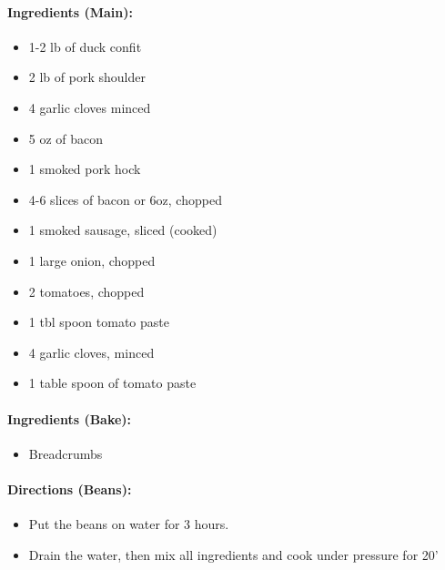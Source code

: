 \documentclass{article}
\begin{document}
\paragraph{Ingredients (Main):}
\begin{itemize}
    \item 1-2 lb of duck confit
    \item 2 lb of pork shoulder
    \item 4 garlic cloves minced
    \item 5 oz of bacon
    \item 1 smoked pork hock
    \item 4-6 slices of bacon or 6oz, chopped
    \item 1 smoked sausage, sliced (cooked)
    \item 1 large onion, chopped
    \item 2 tomatoes, chopped
    \item 1 tbl spoon tomato paste
    \item 4 garlic cloves, minced
    \item 1 table spoon of tomato paste
\end{itemize}  

\paragraph{Ingredients (Bake):}
\begin{itemize}
    \item Breadcrumbs
\end{itemize}  

\paragraph{Directions (Beans):}
\begin{itemize}
    \item Put the beans on water for 3 hours.
    \item Drain the water, then mix all ingredients and cook under pressure for 20'
\end{itemize}  
\end{document}
